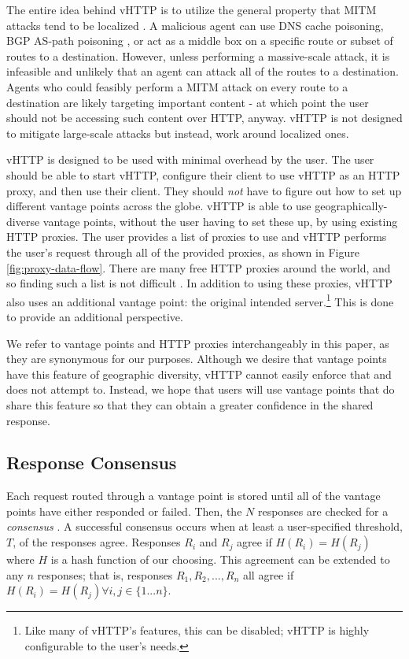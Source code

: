 The entire idea behind vHTTP is to utilize the general property that MITM
attacks tend to be localized \cite{MITM-Survey}. A malicious agent can use DNS
cache poisoning, BGP AS-path poisoning \cite{Hotpets17}, or act as a middle
box on a specific route or subset of routes to a destination. However, unless
performing a massive-scale attack, it is infeasible and unlikely that an agent
can attack all of the routes to a destination. Agents who could feasibly
perform a MITM attack on every route to a destination are likely targeting
important content - at which point the user should not be accessing such
content over HTTP, anyway. vHTTP is not designed to mitigate large-scale
attacks but instead, work around localized ones.

vHTTP is designed to be used with minimal overhead by the user. The user should
be able to start vHTTP, configure their client to use vHTTP as an HTTP proxy,
and then use their client. They should \emph{not} have to figure out how to set
up different vantage points across the globe. vHTTP is able to use
geographically-diverse vantage points, without the user having to set these up,
by using existing HTTP proxies. The user provides a list of proxies to use and
vHTTP performs the user's request through all of the provided proxies, as shown
in Figure \ref{fig:proxy-data-flow}. There are many free HTTP proxies around
the world, and so finding such a list is not difficult
\cite{HideMyName-Proxies, NordVPN-Proxies, FreeProxyList}. In addition to using
these proxies, vHTTP also uses an additional vantage point: the original
intended server.\footnote{Like many of vHTTP's features, this can be disabled;
vHTTP is highly configurable to the user's needs.} This is done to provide an
additional perspective.

We refer to vantage points and HTTP proxies interchangeably in this paper, as
they are synonymous for our purposes. Although we desire that vantage points
have this feature of geographic diversity, vHTTP cannot easily enforce that
and does not attempt to. Instead, we hope that users will use vantage points
that do share this feature so that they can obtain a greater confidence in the
shared response.



\subsection{Response Consensus}

Each request routed through a vantage point is stored until all of the
vantage points have either responded or failed. Then, the $N$ responses are
checked for a \textit{consensus} \cite{Perspectives}. A successful consensus
occurs when at least a user-specified threshold, $T$, of the responses agree.
Responses $R_i$ and $R_j$ agree if $H(R_i) = H(R_j)$ where $H$ is a hash
function of our choosing. This agreement can be extended to any $n$ responses;
that is, responses $R_1, R_2, ..., R_n$ all agree if
$H(R_i) = H(R_j) \forall i, j \in \{1...n\}$.

